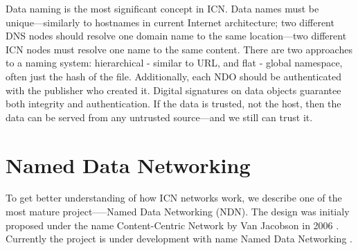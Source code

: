 Data naming is the most significant concept in ICN. Data names must be unique––similarly to hostnames in current Internet architecture; two different DNS nodes should resolve one domain name to the same location––two different ICN nodes must resolve one name to the same content. 
There are two approaches to a naming system: hierarchical - similar to URL, and flat - global namespace, often just the hash of the file.
Additionally, each NDO should be authenticated with the publisher who created it. Digital signatures on data objects guarantee both integrity and authentication. If the data is trusted, not the host, then the data can be served from any untrusted source––and we still can trust it.

\section{Named Data Networking}
To get better understanding of how ICN networks work, we describe one of the most mature project–––Named Data Networking (NDN). The design was initialy proposed under the name Content-Centric Network by Van Jacobson in 2006 \cite{4ANewWay38:online}. Currently the project is under development with name Named Data Networking \cite{NamedDat22:online}. 

